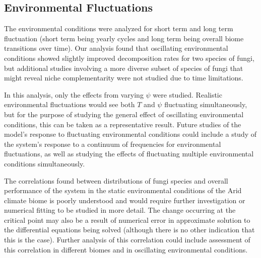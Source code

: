 \documentclass[12pt]{article}
\begin{document}
\begin{multicols}{2}
\subsection{Environmental Fluctuations}

The environmental conditions were analyzed for short term and long term fluctuation (short term being yearly cycles and long term being overall biome transitions over time). Our analysis found that oscillating environmental conditions showed slightly improved decomposition rates for two species of fungi, but additional studies involving a more diverse subset of species of fungi that might reveal niche complementarity were not studied due to time limitations.

In this analysis, only the effects from varying $\psi$ were studied. Realistic environmental fluctuations would see both $T$ and $\psi$ fluctuating simultaneously, but for the purpose of studying the general effect of oscillating environmental conditions, this can be taken as a representative result. Future studies of the model's response to fluctuating environmental conditions could include a study of the system's response to a continuum of frequencies for environmental fluctuations, as well as studying the effects of fluctuating multiple environmental conditions simultaneously. 

The correlations found between distributions of fungi species and overall performance of the system in the static environmental conditions of the Arid climate biome is poorly understood and would require further investigation or numerical fitting to be studied in more detail. The change occurring at the critical point may also be a result of numerical error in approximate solution to the differential equations being solved (although there is no other indication that this is the case). Further analysis of this correlation could include assessment of this correlation in different biomes and in oscillating environmental conditions. 


\end{multicols}
\end{document}
